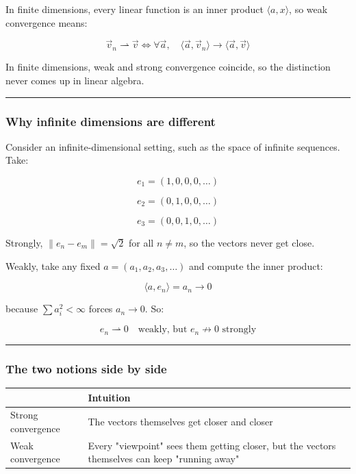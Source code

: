 In finite dimensions, every linear function is an inner product \(\langle a, x \rangle\), so weak convergence means:

\[
\vec{v}_n \rightharpoonup \vec{v} \iff \forall \vec{a},\quad \langle \vec{a}, \vec{v}_n \rangle \to \langle \vec{a}, \vec{v} \rangle
\]

In finite dimensions, weak and strong convergence coincide, so the distinction never comes up in linear algebra.

\hrule

\subsubsection{Why infinite dimensions are different}

Consider an infinite-dimensional setting, such as the space of infinite sequences. Take:

\[
e_1 = (1, 0, 0, 0, \ldots)
\]

\[
e_2 = (0, 1, 0, 0, \ldots)
\]

\[
e_3 = (0, 0, 1, 0, \ldots)
\]

Strongly, \(\|e_n - e_m\| = \sqrt{2}\) for all \(n \neq m\), so the vectors never get close.

Weakly, take any fixed \(a = (a_1, a_2, a_3, \ldots)\) and compute the inner product:

\[
\langle a, e_n \rangle = a_n \to 0
\]

because \(\sum a_i^2 < \infty\) forces \(a_n \to 0\). So:

\[
e_n \rightharpoonup 0 \quad \text{weakly, but } e_n \not\to 0 \text{ strongly}
\]

\hrule

\subsubsection{The two notions side by side}

\begin{center}
\begin{tabular}{ll}
\toprule
 & Intuition \\
\midrule
Strong convergence & The vectors themselves get closer and closer \\
Weak convergence & Every "viewpoint" sees them getting closer, but the vectors themselves can keep "running away" \\
\bottomrule
\end{tabular}
\end{center}

